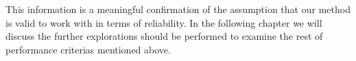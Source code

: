 This information is a meaningful confirmation of the assumption that our method is valid to work with in terms of reliability. In the following chapter we will discuss the further explorations should be performed to examine the rest of performance criterias mentioned above.





